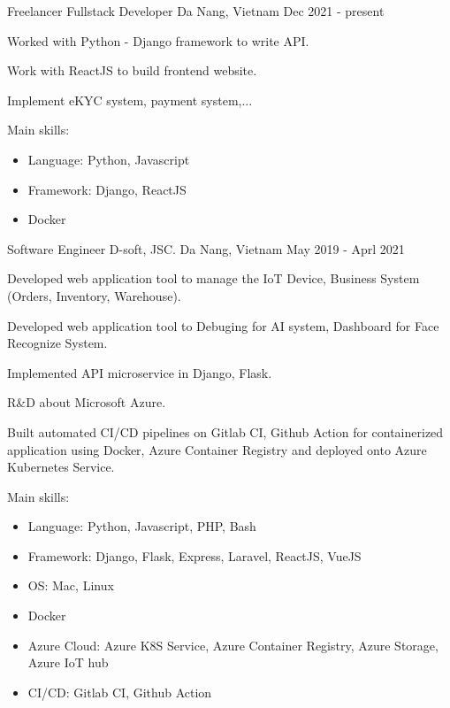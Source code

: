 \begin{cventries}

\cventry
  {Freelancer} %
  {Fullstack Developer} %
  {Da Nang, Vietnam} %
  {Dec 2021 - present} %
  {
    \begin{cvitems} %
      \item {Worked with Python - Django framework to write API.}
      \item {Work with ReactJS to build frontend website.}
      \item {Implement eKYC system, payment system,...}
      \item {Main skills:
        \begin{itemize}
          \item {Language: Python, Javascript}
          \item {Framework: Django, ReactJS}
          \item {Docker}
        \end{itemize}
      }
    \end{cvitems}
  }


  \cventry
    {Software Engineer} %
    {D-soft, JSC.} %
    {Da Nang, Vietnam} %
    {May 2019 - Aprl 2021} %
    {
      \begin{cvitems} %
        \item {Developed web application tool to manage the IoT Device, Business System (Orders, Inventory, Warehouse).}
        \item {Developed web application tool to Debuging for AI system, Dashboard for Face Recognize System.}
        \item {Implemented API microservice in Django, Flask.}
        \item {R\&D about Microsoft Azure.}
        \item {Built automated CI/CD pipelines on Gitlab CI, Github Action for containerized application using Docker, Azure Container Registry and deployed onto Azure Kubernetes Service.}
        \item {Main skills:
        	\begin{itemize}
        		\item {Language: Python, Javascript, PHP, Bash}
  				\item {Framework: Django, Flask, Express, Laravel, ReactJS, VueJS}
				\item {OS: Mac, Linux}
  				\item {Docker}
  				\item {Azure Cloud: Azure K8S Service, Azure Container Registry, Azure Storage, Azure IoT hub}
  				\item {CI/CD: Gitlab CI, Github Action}
			\end{itemize}
        }
      \end{cvitems}
    }


\end{cventries}
